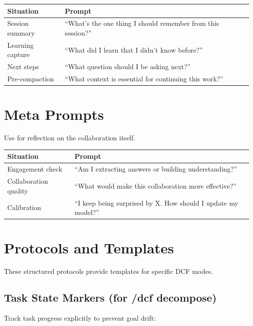 \begin{table}[H]
\centering
\begin{tabular}{p{3cm}p{9cm}}
\toprule
\textbf{Situation} & \textbf{Prompt} \\
\midrule
Session summary & ``What's the one thing I should remember from this session?'' \\
Learning capture & ``What did I learn that I didn't know before?'' \\
Next steps & ``What question should I be asking next?'' \\
Pre-compaction & ``What context is essential for continuing this work?'' \\
\bottomrule
\end{tabular}
\end{table}

\section{Meta Prompts}

Use for reflection on the collaboration itself.

\begin{table}[H]
\centering
\begin{tabular}{p{3cm}p{9cm}}
\toprule
\textbf{Situation} & \textbf{Prompt} \\
\midrule
Engagement check & ``Am I extracting answers or building understanding?'' \\
Collaboration quality & ``What would make this collaboration more effective?'' \\
Calibration & ``I keep being surprised by X. How should I update my model?'' \\
\bottomrule
\end{tabular}
\end{table}

\section{Protocols and Templates}\label{sec:protocols-templates}

These structured protocols provide templates for specific DCF modes.

\subsection{Task State Markers (for /dcf decompose)}

Track task progress explicitly to prevent goal drift:

